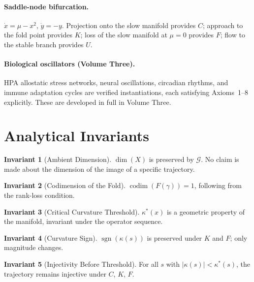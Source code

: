 \documentclass[12pt, oneside]{book}
\theoremstyle{plain}
\theoremstyle{definition}
\newtheorem{invariant}{Invariant}[section]
\theoremstyle{remark}
\begin{document}
\paragraph{Saddle-node bifurcation.}
$\dot x = \mu - x^2$, $\dot y = -y$. Projection onto the slow
manifold provides $C$; approach to the fold point provides $K$; loss
of the slow manifold at $\mu = 0$ provides $F$; flow to the stable
branch provides $U$.

\paragraph{Biological oscillators (Volume Three).}
HPA allostatic stress networks, neural oscillations, circadian rhythms,
and immune adaptation cycles are verified instantiations, each satisfying
Axioms~1--8 explicitly. These are developed in full in Volume Three.

\section{Analytical Invariants}

\begin{invariant}[Ambient Dimension]
$\dim(X)$ is preserved by $\mathcal{G}$. No claim is made about the
dimension of the image of a specific trajectory.
\end{invariant}

\begin{invariant}[Codimension of the Fold]
$\operatorname{codim}(F(\gamma)) = 1$, following from the rank-loss
condition.
\end{invariant}

\begin{invariant}[Critical Curvature Threshold]
$\kappa^*(x)$ is a geometric property of the manifold, invariant under
the operator sequence.
\end{invariant}

\begin{invariant}[Curvature Sign]
$\operatorname{sgn}(\kappa(s))$ is preserved under $K$ and $F$; only
magnitude changes.
\end{invariant}

\begin{invariant}[Injectivity Before Threshold]
For all $s$ with $|\kappa(s)| < \kappa^*(s)$, the trajectory remains
injective under $C$, $K$, $F$.
\end{invariant}
\end{document}
